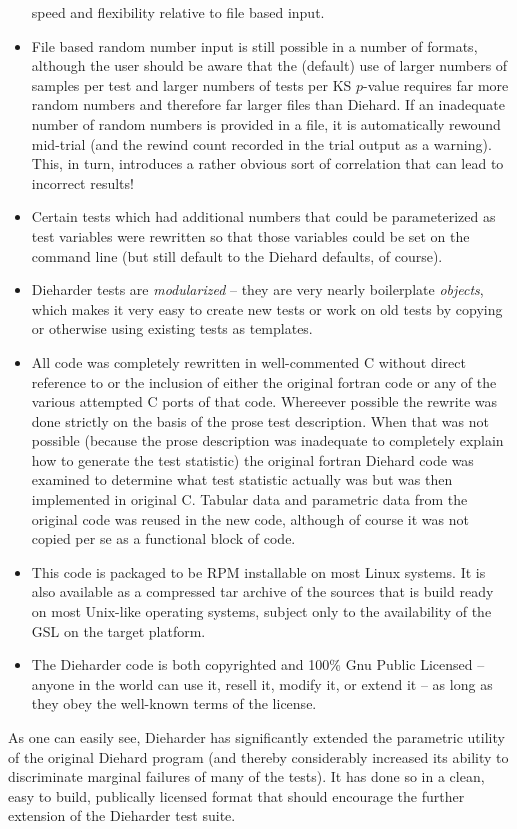 \documentclass[12pt]{article}
\begin{document}
\begin{itemize}
speed and flexibility relative to file based input.
 \item File based random number input is still possible in a number of
formats, although the user should be aware that the (default) use of
larger numbers of samples per test and larger numbers of tests per KS
$p$-value requires far more random numbers and therefore far larger
files than Diehard.  If an inadequate number of random numbers is
provided in a file, it is automatically rewound mid-trial (and the
rewind count recorded in the trial output as a warning).  This, in turn,
introduces a rather obvious sort of correlation that can lead to
incorrect results!
 \item Certain tests which had additional numbers that could be
parameterized as test variables were rewritten so that those variables
could be set on the command line (but still default to the Diehard
defaults, of course).
 \item Dieharder tests are {\em modularized} -- they are very nearly
boilerplate {\em objects}, which makes it very easy to create new tests
or work on old tests by copying or otherwise using existing tests as
templates.
 \item All code was completely rewritten in well-commented C without
direct reference to or the inclusion of either the original fortran code
or any of the various attempted C ports of that code.  Whereever
possible the rewrite was done strictly on the basis of the prose test
description.  When that was not possible (because the prose description
was inadequate to completely explain how to generate the test statistic)
the original fortran Diehard code was examined to determine what test
statistic actually was but was then implemented in original C.  Tabular
data and parametric data from the original code was reused in the new
code, although of course it was not copied per se as a functional block
of code.
 \item This code is packaged to be RPM installable on most Linux
systems.  It is also available as a compressed tar archive of the
sources that is build ready on most Unix-like operating systems, subject
only to the availability of the GSL on the target platform.
 \item The Dieharder code is both copyrighted and 100\% Gnu Public
Licensed -- anyone in the world can use it, resell it, modify it, or
extend it -- as long as they obey the well-known terms of the license.
\end{itemize}

As one can easily see, Dieharder has significantly extended the
parametric utility of the original Diehard program (and thereby
considerably increased its ability to discriminate marginal failures of
many of the tests).  It has done so in a clean, easy to build,
publically licensed format that should encourage the further extension
of the Dieharder test suite.
\end{document}
